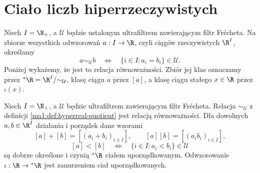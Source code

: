 \section{Ciało liczb hiperrzeczywistych}
\label{ma1:sec:hyperreal-field}
\begin{definicja}
\label{ma1:def:hyperreal-quotient}
Niech $I=\N_+$, a $\mathcal U$ będzie ustalonym ultrafiltrem zawierającym filtr Frécheta. Na zbiorze wszystkich odwzorowań $a:I\to\R$, czyli ciągów rzeczywistych $\R^I$, określamy
\[
 a\sim_{\mathcal U}b\quad\Longleftrightarrow\quad
 \{i\in I:a_i=b_i\}\in\mathcal U.
\]
Poniżej wykażemy, że jest to relacja równoważności. Zbiór jej klas oznaczamy przez $\mathord{}^*\R=\R^I/{\sim_{\mathcal U}}$, klasę ciągu $a$ przez $[a]$, a klasę ciągu stałego $x\in\R$ przez $\iota(x)$.
\end{definicja}
\begin{twierdzenie}
\label{ma1:thm:hyperreal-field}
Niech $I=\N_+$, a $\mathcal U$ będzie ultrafiltrem zawierającym filtr Frécheta. Relacja $\sim_{\mathcal U}$ z definicji \ref{ma1:def:hyperreal-quotient} jest relacją równoważności. Dla dowolnych $a,b\in\R^I$ działania i porządek dane wzorami
\[
 [a]+[b]=[(a_i+b_i)_{i\in I}],\qquad [a][b]=[(a_ib_i)_{i\in I}],
\]
\[
 [a]<[b]\quad\Longleftrightarrow\quad \{i\in I:a_i<b_i\}\in\mathcal U
\]
są dobrze określone i czynią $\mathord{}^*\R$ ciałem uporządkowanym. Odwzorowanie $\iota:\R\to{}^*\R$ jest zanurzeniem ciał uporządkowanych.
\end{twierdzenie}
